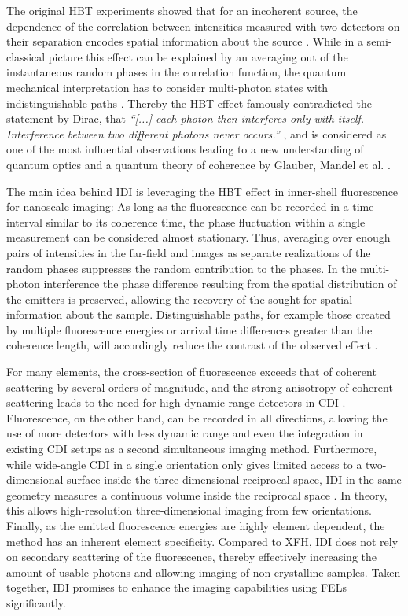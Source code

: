 The original  HBT experiments showed that for an incoherent source, the dependence of the correlation between intensities measured with two detectors on their separation encodes spatial information about the source \cite{baym1997}. While in a semi-classical picture this effect can be explained by an averaging out of the instantaneous random phases in the correlation function, the quantum mechanical interpretation has to consider multi-photon states with indistinguishable paths \cite{fano1961,glauber2006}. Thereby the HBT effect famously contradicted the statement by Dirac, that \textit{\enquote{[...] each photon then interferes only with itself. Interference between two different photons never occurs.}} \cite{dirac1958}, and is considered as one of the most influential observations leading to a new understanding of quantum optics and a quantum theory of coherence by Glauber, Mandel et al. \cite{glauber1963,mandel1959, hong1987}.

The main idea behind IDI is leveraging the HBT effect in inner-shell fluorescence for nanoscale imaging: As long as the fluorescence can be recorded in a time interval similar to its coherence time, the phase fluctuation within a single measurement can be considered almost stationary. Thus, averaging over enough pairs of intensities in the far-field and images as separate realizations of the random phases suppresses the random contribution to the phases.  In the multi-photon interference the phase difference resulting from the spatial distribution of the emitters is preserved,  allowing the recovery of the sought-for spatial information about the sample. Distinguishable paths, for example those created by multiple fluorescence energies or arrival time differences greater than the coherence length, will accordingly reduce the contrast of the observed effect \cite{classen2017,trost2020}. 

For many elements, the cross-section of fluorescence exceeds that of coherent scattering by several orders of magnitude, and the strong anisotropy of coherent scattering leads to the need for high dynamic range detectors in CDI \cite{xraylib,attwood1999}.  Fluorescence, on the other hand, can be recorded in all directions, allowing the use of more detectors with less dynamic range and even the integration in existing CDI setups as a second simultaneous imaging method. Furthermore, while wide-angle CDI in a single orientation only gives limited access to a two-dimensional surface inside the three-dimensional reciprocal space, IDI in the same geometry measures a continuous volume inside the reciprocal space \cite{barke2015,classen2017}. In theory, this allows high-resolution three-dimensional imaging from few orientations. Finally, as the emitted fluorescence energies are highly element dependent, the method has an inherent element specificity. Compared to XFH, IDI does not rely on secondary scattering of the fluorescence, thereby effectively increasing the amount of usable photons and allowing imaging of non crystalline samples. Taken together, IDI promises to enhance the imaging capabilities using FELs significantly. 

